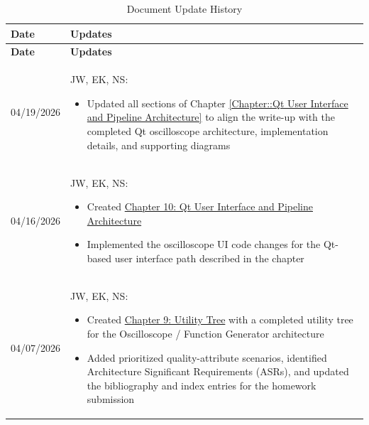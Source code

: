 \begin{longtable}{|l||p{13.5cm}|}
\caption{Document Update History \label{Table::UpdateHistory}}\\
\hline
\textbf{Date} & \textbf{Updates} \\
\hline
\endfirsthead

\hline
\textbf{Date} & \textbf{Updates} \\
\hline
\endhead

04/19/2026 &
JW, EK, NS:
\begin{itemize}[topsep=0pt,itemsep=0pt,parsep=0pt,partopsep=0pt,leftmargin=12pt]
\item Updated all sections of Chapter \ref{Chapter::Qt User Interface and Pipeline Architecture} to align the write-up with the completed Qt oscilloscope architecture, implementation details, and supporting diagrams
\end{itemize}
\\ \hline

04/16/2026 &
JW, EK, NS:
\begin{itemize}[topsep=0pt,itemsep=0pt,parsep=0pt,partopsep=0pt,leftmargin=12pt]
\item Created \hyperref[Chapter::Qt User Interface and Pipeline Architecture]{Chapter 10: Qt User Interface and Pipeline Architecture}
\item Implemented the oscilloscope UI code changes for the Qt-based user interface path described in the chapter
\end{itemize}
\\ \hline

04/07/2026 & 
JW, EK, NS:
\begin{itemize}[topsep=0pt,itemsep=0pt,parsep=0pt,partopsep=0pt,leftmargin=12pt]
\item Created \hyperref[Chapter::Example of a Utility Tree]{Chapter 9: Utility Tree} with a completed utility tree for the Oscilloscope / Function Generator architecture
\item Added prioritized quality-attribute scenarios, identified Architecture Significant Requirements (ASRs), and updated the bibliography and index entries for the homework submission
\end{itemize}
\\ \hline


\end{longtable}
